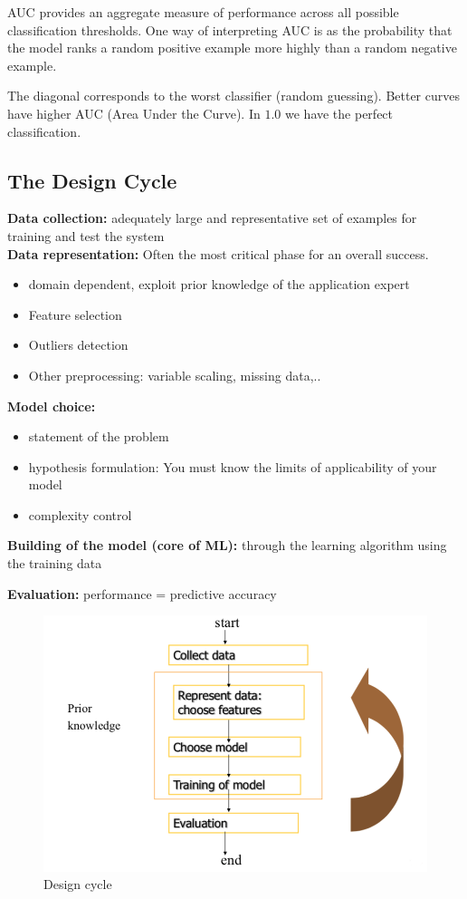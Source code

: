 \documentclass[../main.tex]{subfiles}
\begin{document}
AUC provides an aggregate measure of performance across all possible classification thresholds. One way of interpreting AUC is as the probability that the model ranks a random positive example more highly than a random negative example.

The diagonal corresponds to the worst classifier (random guessing). Better curves have higher AUC (Area Under the Curve). In $1.0$ we have the perfect classification.

\subsection{The Design Cycle}
\noindent\textbf{Data collection:} adequately large and representative set of examples for training and test the system\\

\noindent\textbf{Data representation:} Often the most critical phase for an overall success.
\begin{itemize}
    \item domain dependent, exploit prior knowledge of the application expert
    \item Feature selection
    \item Outliers detection
    \item Other preprocessing: variable scaling, missing data,..
\end{itemize}

\noindent\textbf{Model choice:}
\begin{itemize}
    \item statement of the problem
    \item hypothesis formulation: You must know the limits of applicability of your model
    \item complexity control
\end{itemize}
\noindent\textbf{Building of the model (core of ML):} through the learning algorithm using the training data

\noindent\textbf{Evaluation:} performance = predictive accuracy

\begin{figure}[H]
    \centering
    \includegraphics[scale = 0.3]{lectures/1_Introduction/intro_design_cycle.png}
    \caption{Design cycle}
    \label{fig:intro_design_cycle}
\end{figure}
\end{document}
